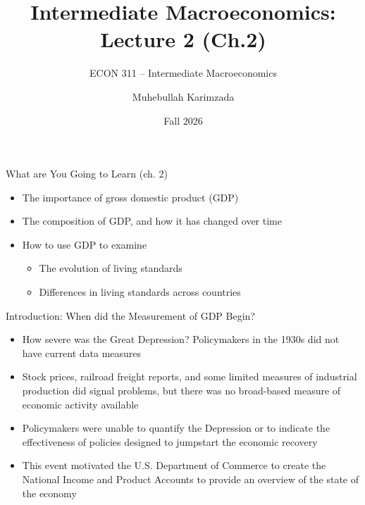 \documentclass[aspectratio=1610]{beamer}
\title[Fall - Lecture 2] %
{Intermediate Macroeconomics: Lecture  2 (Ch.2)}
\subtitle{ECON 311 -- Intermediate Macroeconomics}
\author{Muhebullah Karimzada}
\institute{School of Economics \\\ University of Northern British Columbia}
\date{Fall 2026}
\begin{document}
\begin{frame}[plain]
  \titlepage
\end{frame}

\begin{frame}[wide]{What are You Going to Learn (ch. 2)}
	\begin{itemize}
		\item The importance of gross domestic product (GDP)
		\item The composition of GDP, and how it has changed over time
		\item How to use GDP to examine
		\begin{itemize}
			\item The evolution of living standards
			\item Differences in living standards across countries
		\end{itemize}
	\end{itemize}
\end{frame}

\begin{frame}[wide]{Introduction: When did the Measurement of GDP Begin?}
	\begin{itemize}
		\item How severe was the Great Depression? Policymakers in the 1930s did not have current data measures
		\item Stock prices, railroad freight reports, and some limited measures of industrial production did signal problems, but there was no broad-based measure of economic activity available
		\item Policymakers were unable to quantify the Depression or to indicate the effectiveness of policies designed to jumpstart the economic recovery
		\item This event motivated the U.S. Department of Commerce to create the National Income and Product Accounts to provide an overview of the state of the economy
		
	\end{itemize}
\end{frame}

\end{document}
